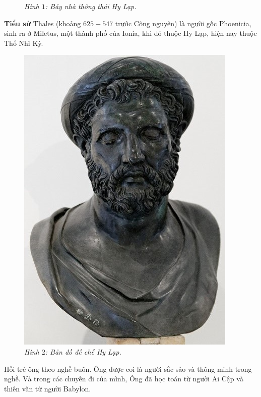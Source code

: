 \begin{multicols}{2}
\begin{figure}[H]
		\caption{\small\textit{\color{lichsutoanhoc}Hình $1$: Bảy nhà thông thái Hy Lạp.}}
		\vspace*{-10pt}
	\end{figure}
	\textbf{Tiểu sử}
	\vskip 0.1cm
	Thales (khoảng $625 - 547$ trước Công nguyên) là người gốc Phoenicia, sinh ra ở Miletus, một thành phố của Ionia, khi đó thuộc Hy Lạp, hiện nay thuộc Thổ Nhĩ Kỳ. 
		\begin{figure}[H]
		\centering
		\vspace*{-5pt}
		\captionsetup{labelformat= empty, justification=centering}
		\includegraphics[width=1\linewidth]{2}
		\caption{\small\textit{\color{lichsutoanhoc}Hình $2$: Bản đồ đế chế Hy Lạp.}}
		\vspace*{-10pt}
	\end{figure}
	Hồi trẻ ông theo nghề buôn. Ông được coi là người sắc sảo và thông minh trong nghề. Và trong các chuyến đi của mình, Ông đã học toán từ người Ai Cập và thiên văn từ người Babylon.

\end{multicols}
